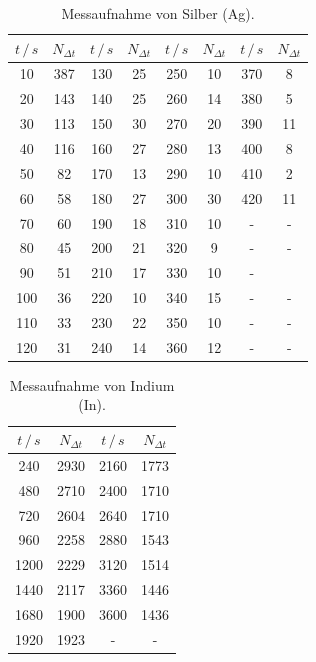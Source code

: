 \begin{table}
  \centering
  \caption{Messaufnahme von Silber (Ag).}
  \label{tab:1}
  \begin{tabular}{c c c c c c c c}
    \toprule
    $t \, /\, s$& $N_{\Delta t}$& $t \, /\, s$& $N_{\Delta t}$ & $t \, /\, s$& $N_{\Delta t}$ & $t \, /\, s$& $N_{\Delta t}$ \\
    \midrule
    10 & 387 & 130 & 25 & 250 & 10 & 370 & 8\\
    20 & 143 & 140 & 25 & 260 & 14 & 380 & 5\\
    30 & 113 & 150 & 30 & 270 & 20 & 390 & 11\\
    40 & 116 & 160 & 27 & 280 & 13 & 400 & 8\\
    50 & 82 & 170 & 13 & 290 & 10 & 410 & \cellcolor{red}2\\
    60 & 58 & 180 & 27 & 300 & 30 & 420 & 11\\
    70 & 60 & 190 & 18 & 310 & 10 & -&-\\
    80 & 45 & 200 & 21 & 320 & 9 & -& - \\
    90 & 51 & 210 & 17 & 330 & 10 & -&\\
    100 & 36 & 220 & 10 & 340 & 15 &- &-\\
    110 & 33 & 230 & 22 & 350 & 10 &- &-\\
    120 & 31 & 240 & 14 & 360 & 12 &- &-\\
    \bottomrule
  \end{tabular}
\end{table}

\begin{table}
  \centering
  \caption{Messaufnahme von Indium (In).}
  \label{tab:2}
  \begin{tabular}{c c c c}
    \toprule
    $t \, /\, s$& $N_{\Delta t}$& $t \, /\, s$& $N_{\Delta t}$ \\
    \midrule
    240  &  2930 & 2160 & 1773\\
    480  &  2710 & 2400 & 1710\\
    720  &  2604 & 2640 & 1710\\
    960  &  2258 & 2880 & 1543\\
    1200 &  2229 & 3120 & 1514\\
    1440 &  2117 & 3360 & 1446\\
    1680 &  1900 & 3600 & 1436\\
    1920 &  1923 & - & -\\
    \bottomrule
  \end{tabular}
\end{table}
